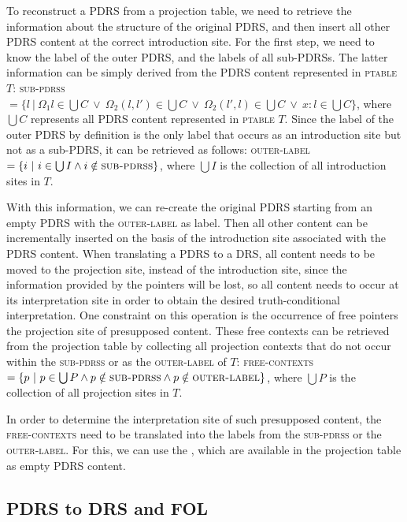 To reconstruct a PDRS from a projection table, we need to
retrieve the information about the structure of the original PDRS,
and then insert all other PDRS content at the correct introduction site. For
the first step, we need to know the label of the outer PDRS, and the labels
of all sub-PDRSs. The latter information can be simply derived from the PDRS
content represented in \textsc{ptable} $T$: \textsc{sub-pdrss} $=\{l~|~\Omega_1
  l \in \bigcup C ~\vee~ \Omega_2(l,l') \in \bigcup C ~\vee~ \Omega_2(l',l) \in
\bigcup C ~\vee~ x:l \in \bigcup C \}$, where $\bigcup C$ represents all
PDRS content represented in \textsc{ptable} $T$. Since the label of the
outer PDRS by definition is the only label that occurs as an introduction
site but not as a sub-PDRS, it can be retrieved as follows:
\textsc{outer-label} $=\{i~|~i\in\bigcup I \wedge i \notin
\textsc{sub-pdrss}\}$, where $\bigcup I$ is the collection of all
introduction sites in $T$.

With this information, we can re-create the original PDRS starting from an
empty PDRS with the \textsc{outer-label} as label. Then all other content
can be incrementally inserted on the basis of the introduction site
associated with the PDRS content. When translating a PDRS to a DRS, all
content needs to be moved to the projection site, instead of the
introduction site, since the information provided by the pointers will be
lost, so all content needs to occur at its interpretation site in order to
obtain the desired truth-conditional interpretation. One constraint on this
operation is the occurrence of free pointers the projection site of
presupposed content. These free contexts can be retrieved from the
projection table by collecting all projection contexts that do not occur
within the \textsc{sub-pdrss} or as the \textsc{outer-label} of $T$:
\textsc{free-contexts} $=\{p~|~p\in\bigcup P \wedge p \notin
\textsc{sub-pdrss} \wedge p \notin \textsc{outer-label}\}$, where $\bigcup
P$ is the collection of all projection sites in $T$.

In order to determine the interpretation site of such presupposed content,
the \textsc{free-contexts} need to be translated into the labels from the
\textsc{sub-pdrss} or the \textsc{outer-label}. For this, we can use the
\MAPs, which are available in the projection table as empty PDRS content.

\subsection{PDRS to DRS and FOL}

